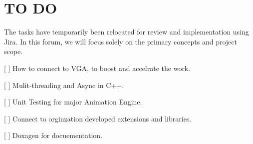 \chapter{TO DO}
\hypertarget{md_docs_2own__docs_2todo}{}\label{md_docs_2own__docs_2todo}
\label{md_docs_2own__docs_2todo_autotoc_md251}%
%
 The tasks have temporarily been relocated for review and implementation using Jira. In this forum, we will focus solely on the primary concepts and project scope.


\begin{DoxyItemize}
\item \mbox{[} \mbox{]} How to connect to VGA, to boost and accelrate the work.
\item \mbox{[} \mbox{]} Mulit-\/threading and Async in C++.
\item \mbox{[} \mbox{]} Unit Testing for major Animation Engine.
\item \mbox{[} \mbox{]} Connect to orginzation developed extensions and libraries.
\item \mbox{[} \mbox{]} Doxagen for docuementation. 
\end{DoxyItemize}